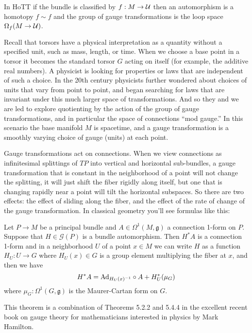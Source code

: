 \documentclass[12pt]{article}
\begin{document}
In HoTT if the bundle is classified by \( f:M\to \mathcal{U} \) then an automorphism is a homotopy \( f\sim f \) and the group of gauge transformations is the loop space \( \Omega_f(M\to \mathcal{U}) \). 

Recall that torsors have a physical interpretation as a quantity without a specified unit, such as mass, length, or time. When we choose a base point in a torsor it becomes the standard torsor \( G \) acting on itself (for example, the additive real numbers). A physicist is looking for properties or laws that are independent of such a choice. In the 20th century physicists further wondered about choices of units that vary from point to point, and began searching for laws that are invariant under this much larger space of transformations. And so they and we are led to explore quotienting by the action of the group of gauge transformations, and in particular the space of connections ``mod gauge.'' In this scenario the base manifold \( M \) is spacetime, and a gauge transformation is a smoothly varying choice of gauge (units) at each point.

Gauge transformations act on connections. When we view connections as infinitesimal splittings of \( TP \) into vertical and horizontal sub-bundles, a gauge transformation that is constant in the neighborhood of a point will not change the splitting, it will just shift the fiber rigidly along itself, but one that is changing rapidly near a point will tilt the horizontal subspaces. So there are two effects: the effect of sliding along the fiber, and the effect of the rate of change of the gauge transformation. In classical geometry you'll see formulas like this:

\begin{mythm}
Let \( P\to M \) be a principal bundle and \( A\in\Omega^1(M,\mathfrak{g}) \) a connection 1-form on \( P \). Suppose that \( H\in \mathscr{G}(P) \) is a bundle automorphism. Then \( H^*A \) is a connection 1-form and in a neighborhood \( U \) of a point \( x\in M \) we can write \( H \) as a function \( H_U:U\to G \) where \( H_U(x)\in G \) is a group element multiplying the fiber at \( x \), and then we have
\[ 
H^*A=\mathrm{Ad}_{H_U(x)^{-1}}\circ A + H_U^*(\mu_G)
\] where \( \mu_G:\Omega^1(G,\mathfrak{g}) \) is the Maurer-Cartan form on \( G \).
\end{mythm}

This theorem is a combination of Theorems 5.2.2 and 5.4.4 in the excellent recent book on gauge theory for mathematicians interested in physics by Mark Hamilton\cite{hamilton2017}.
\end{document}

